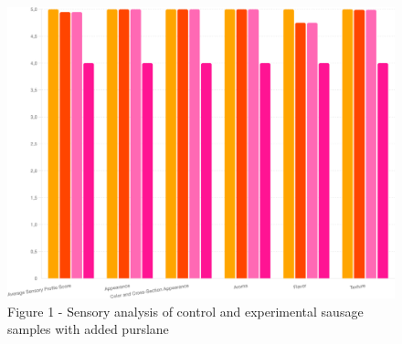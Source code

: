 \begin{figure}[H]
	\centering
	\includegraphics[height=0.4\textwidth, width=\textwidth]{assets/306}
	\caption*{Figure 1 - Sensory analysis of control and experimental sausage
  samples with added purslane}
\end{figure}


